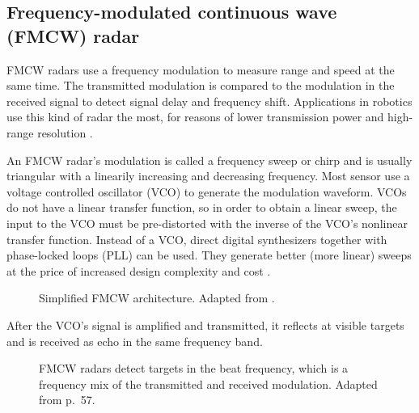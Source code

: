 \subsection{Frequency-modulated continuous wave (FMCW) radar}\label{frequency-modulated-continuous-wave-fmcw-radar}

FMCW radars use a frequency modulation to measure range and speed at the
same time. The transmitted modulation is compared to the modulation in
the received signal to detect signal delay and frequency shift.
Applications in robotics use this kind of radar the most, for reasons of
lower transmission power and high-range resolution \cite{Adams2012}.

An FMCW radar's modulation is called a frequency sweep or chirp and is
usually triangular with a linearily increasing and decreasing frequency.
Most sensor use a voltage controlled oscillator (VCO) to generate the
modulation waveform. VCOs do not have a linear transfer function, so in
order to obtain a linear sweep, the input to the VCO must be
pre-distorted with the inverse of the VCO's nonlinear transfer function.
Instead of a VCO, direct digital synthesizers together with phase-locked
loops (PLL) can be used. They generate better (more linear) sweeps at
the price of increased design complexity and cost \cite{Ernst2016}.

\begin{figure}[htp]
    \centering
    \def\svgwidth{\linewidth}
    
    \caption{\label{fig:fmcw_blocks}Simplified FMCW architecture. Adapted from \cite{VanZeijl2014}.}
\end{figure}

After the VCO's signal is amplified and transmitted, it reflects at
visible targets and is received as echo in the same frequency band.

\begin{figure}[htp]
    \centering
    \def\svgwidth{10cm}
    
    \caption{\label{fig:fmcw_triangular}FMCW radars detect targets in the beat frequency, which is a frequency mix of the transmitted and received modulation. Adapted from \cite{Adams2012} p.~57.}
\end{figure}

